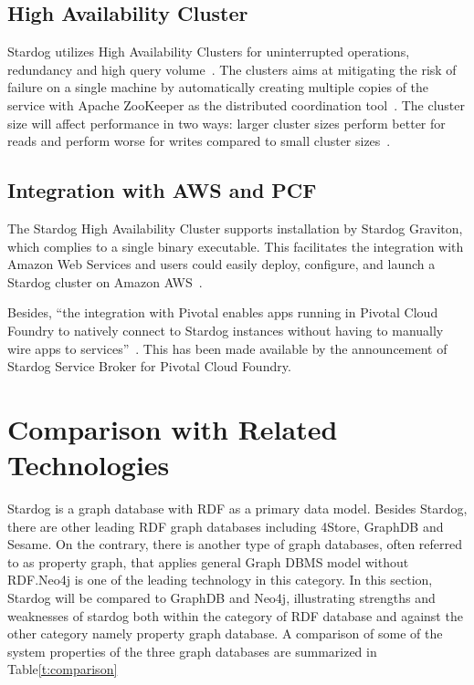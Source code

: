 \subsection{High Availability Cluster}
Stardog utilizes High Availability Clusters for uninterrupted operations, 
redundancy and high query volume~\cite{hid-sp18-405-www-stardog-docs}. 
The clusters aims at mitigating the risk of failure on a single machine by 
automatically creating multiple copies of the service with Apache ZooKeeper 
as the distributed coordination 
tool~\cite{hid-sp18-405-www-stardog-predictiveanalyticstoday}. The cluster 
size will affect performance in two ways: larger cluster sizes perform better 
for reads and perform worse for writes compared to small cluster 
sizes~\cite{hid-sp18-405-www-stardog-docs}. 

\subsection{Integration with AWS and PCF}
The Stardog High Availability Cluster supports installation by Stardog 
Graviton, which complies to a single binary executable. This facilitates the 
integration with Amazon Web Services and users could easily deploy, 
configure, and launch a Stardog cluster on Amazon 
AWS~\cite{hid-sp18-405-blog-stardog-aws}. 

Besides, ``the integration with Pivotal enables apps running in Pivotal 
Cloud Foundry to natively connect to Stardog instances without having to 
manually wire apps to services''~\cite{hid-sp18-405-blog-stardog-pcf}. This 
has been made available by the announcement of Stardog Service Broker for 
Pivotal Cloud Foundry.

\section{Comparison with Related Technologies}
Stardog is a graph database with RDF as a primary data model. Besides 
Stardog, there are other leading RDF graph databases including 4Store, 
GraphDB and Sesame. On the contrary, there is another type of graph 
databases, often referred to as property graph, that applies general Graph 
DBMS model without RDF.\@ Neo4j is one of the leading technology in this 
category. In this section, Stardog will be compared to GraphDB and Neo4j, 
illustrating strengths and weaknesses of stardog both within the category of 
RDF database and against the other category namely property graph 
database. A comparison of some of the system properties of the three graph 
databases are summarized in 
Table\ref{t:comparison}~\cite{hid-sp18-405-www-stardog-dbengines-neo4j}~\cite{hid-sp18-405-www-stardog-dbengines-graphdb}

